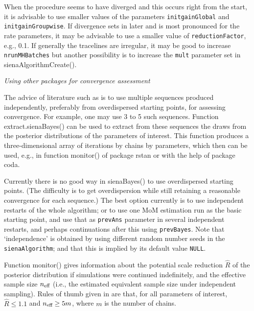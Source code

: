\documentclass[a4paper,fleqn,11pt]{article}
\newcommand{\+}{\, + \,}
\newcommand{\sfn}[1]{\textsf{#1}}
\begin{document}
When the procedure seems to have diverged and this occurs right
from the start, it is
advisable to use smaller values of the parameters \texttt{initgainGlobal}
and \texttt{initgainGroupwise}.
If divergence sets in later and is most pronounced
for the rate parameters, it may be advisable to use a smaller value of
\texttt{reductionFactor}, e.g., 0.1.
If generally the tracelines are irregular, it may be good to increase
\texttt{nrunMHBatches} but another possibility is to increase
the \texttt{mult} parameter set in \sfn{sienaAlgorithmCreate()}.

\medskip

\noindent
\emph{Using other packages for convergence assessment}
\smallskip

\noindent
The advice of literature such as \citet{BDA3} is to use multiple
sequences produced independently, preferably from overdispersed
starting points, for assessing convergence.
For example, one may use 3 to 5 such sequences.
Function \sfn{extract.sienaBayes()} can be used to extract
from these sequences the draws from the posterior distributions
of the parameters of interest.
This function produces a three-dimensional array of
iterations by chains by parameters, which then can be used, e.g., in
function \sfn{monitor()} of package \sfn{rstan} or with the
help of package \sfn{coda}.

Currently there is no good way in \sfn{sienaBayes()} to use
overdispersed starting points. (The difficulty is to get overdispersion
while still retaining a reasonable convergence for each sequence.)
The best option currently is to use independent restarts of the whole
algorithm; or to use one MoM estimation run as the basic starting
point, and use that as \texttt{prevAns} parameter in several independent
restarts, and perhaps continuations after this using \texttt{prevBayes}.
Note that `independence' is obtained by using different random
number seeds in the \texttt{sienaAlgorithm}; and that this is implied
by its default value \texttt{NULL}.

Function \sfn{monitor()} gives information about the potential
scale reduction $\hat R$ of the posterior distribution if simulations
were continued indefinitely, and the effective sample size
$n_{\text{\scriptsize eff}}$ (i.e., the estimated equivalent
sample size under independent sampling).
Rules of thumb given in \citet[][p. 287]{BDA3} are that,
for all parameters of interest,
$\hat R \leq 1.1$ and $n_{\text{\scriptsize eff}} \geq 5m$,
where $m$ is the number of chains.
\end{document}
